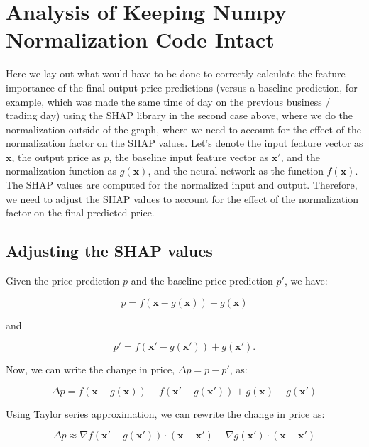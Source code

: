 \documentclass{article}
\begin{document}
\section{Analysis of Keeping Numpy Normalization Code Intact}

Here we lay out what would have to be done to correctly calculate the feature importance of the final output price predictions (versus a baseline prediction, for example, which was made the same time of day on the previous business / trading day) using the SHAP library in the second case above, where we do the normalization outside of the graph, where we need to account for the effect of the normalization factor on the SHAP values. Let's denote the input feature vector as $\mathbf{x}$, the output price as $p$, the baseline input feature vector as $\mathbf{x'}$, and the normalization function as $g(\mathbf{x})$, and the neural network as the function $f(\mathbf{x})$. The SHAP values are computed for the normalized input and output. Therefore, we need to adjust the SHAP values to account for the effect of the normalization factor on the final predicted price.

\subsection{Adjusting the SHAP values}
Given the price prediction $p$ and the baseline price prediction $p'$, we have:

\begin{equation}
    p = f(\mathbf{x} - g(\mathbf{x})) + g(\mathbf{x})
\end{equation}

and

\begin{equation}
    p' = f(\mathbf{x'} - g(\mathbf{x'})) + g(\mathbf{x'}).
\end{equation}

Now, we can write the change in price, $\Delta p = p - p'$, as:

\begin{equation}
    \Delta p = f(\mathbf{x} - g(\mathbf{x})) - f(\mathbf{x'} - g(\mathbf{x'})) + g(\mathbf{x}) - g(\mathbf{x'})    
\end{equation}

Using Taylor series approximation, we can rewrite the change in price as:

\begin{equation} \label{eq:taylor_approximate}
    \Delta p \approx \nabla f(\mathbf{x'} - g(\mathbf{x'})) \cdot (\mathbf{x} - \mathbf{x'}) - \nabla g(\mathbf{x'}) \cdot (\mathbf{x} - \mathbf{x'})
\end{equation}
\end{document}
